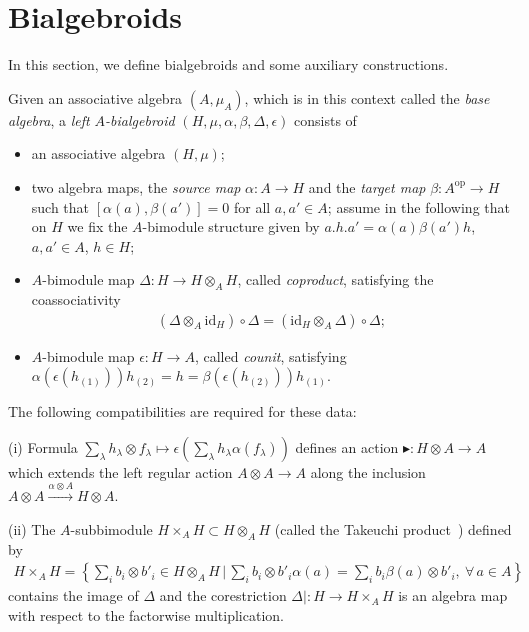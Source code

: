 \documentclass[10pt,a4paper]{amsart}
\def\op{\mathrm{op}}
\def\id{\mathrm{id}}
\numberwithin{equation}{section}
\begin{document}
\section{Bialgebroids}\label{sec:bialgebroids}

In this section, we define bialgebroids and some auxiliary constructions.
\begin{Definition}
Given an associative algebra $(A,\mu_A)$, which is in this context called the {\it base algebra}, a {\it left $A$-bialgebroid} $(H,\mu,\alpha,\beta,\Delta,\epsilon)$ consists of
\begin{itemize}\itemsep=0pt
\item an associative algebra $(H,\mu)$;
\item two algebra maps, the {\it source map} $\alpha\colon A\to H$ and the {\it target map} $\beta\colon A^\op\to H$ such that $[\alpha(a),\beta(a')] = 0$ for all $a,a'\in A$; assume in the following that on $H$ we fix the $A$-bimodule
structure given by $a.h.a' = \alpha(a)\beta(a')h$, $a,a'\in A$, $h\in H$;

\item $A$-bimodule map $\Delta \colon H\to H\otimes_A H$, called {\it coproduct}, satisfying the coassociativity
\begin{gather*}
(\Delta\otimes_A \id_H)\circ\Delta = (\id_H\otimes_A \Delta)\circ\Delta;
\end{gather*}
\item $A$-bimodule map $\epsilon \colon H\to A$, called {\it counit}, satisfying $\alpha(\epsilon(h_{(1)}))h_{(2)} = h = \beta(\epsilon(h_{(2)}))h_{(1)}$.
\end{itemize}
The following compatibilities are required for these data:

(i) Formula $\sum_\lambda h_\lambda\otimes f_\lambda \mapsto \epsilon(\sum_\lambda h_\lambda\alpha(f_\lambda))$ defines an action $\blacktriangleright\colon H\otimes A\to A$ which extends the left regular action $A\otimes A\to A$ along the inclusion $A\otimes A\stackrel{\alpha\otimes A}\longrightarrow H\otimes A$.

(ii) The $A$-subbimodule $H\times_A H\subset H\otimes_A H$ (called the Takeuchi product~\cite{bohmHbk}) defined by
\begin{gather*}
H\times_A H = \left\lbrace\sum_i b_i\otimes b'_i \in H\otimes_A H \,|\,
\sum_i b_i\otimes b'_i \alpha(a) = \sum_i b_i \beta(a)\otimes b'_i, \ \forall\, a\in A \right\rbrace
\end{gather*}
contains the image of $\Delta$ and the corestriction $\Delta|\colon H\to H\times_A H$ is an algebra map with respect to the factorwise multiplication.
\end{Definition}
\end{document}
